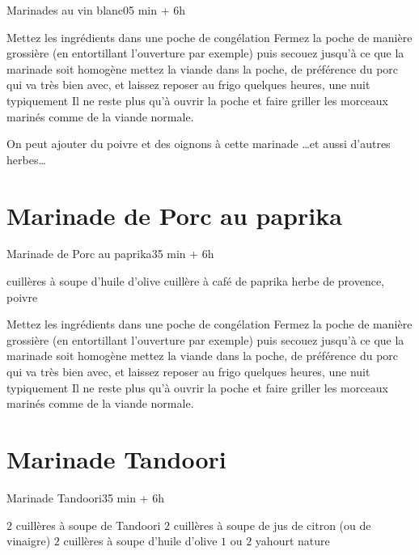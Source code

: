 {\begin{recette}{Marinades au vin blanc}{0}{5 min + 6h}{}
\begin{preparation}
\etape Mettez les ingrédients dans une poche de congélation
\etape Fermez la poche de manière grossière (en entortillant l'ouverture par exemple) puis secouez jusqu'à ce que la marinade 
soit homogène
\etape mettez la viande dans la poche, de préférence du porc qui va très bien avec, et laissez reposer au frigo quelques heures, 
une nuit typiquement
\etape Il ne reste plus qu'à ouvrir la poche et faire griller les morceaux marinés comme de la viande normale.
\end{preparation}

\begin{remarque}
On peut ajouter du poivre et des oignons à cette marinade \dots  et aussi d'autres herbes\dots
\end{remarque}
\end{recette}

\section{Marinade de Porc au paprika}
\begin{recette}{Marinade de Porc au paprika}{3}{5 min + 6h}{}
\begin{ingredients}
 cuillères à soupe d'huile d'olive
 cuillère à café de paprika
\ingredient herbe de provence, poivre
\end{ingredients}

\begin{preparation}
\etape Mettez les ingrédients dans une poche de congélation
\etape Fermez la poche de manière grossière (en entortillant l'ouverture par exemple) puis secouez jusqu'à ce que la marinade 
soit homogène
\etape mettez la viande dans la poche, de préférence du porc qui va très bien avec, et laissez reposer au frigo quelques heures, 
une nuit typiquement
\etape Il ne reste plus qu'à ouvrir la poche et faire griller les morceaux marinés comme de la viande normale.
\end{preparation}

\end{recette}

\section{Marinade Tandoori}
\begin{recette}{Marinade Tandoori}{3}{5 min + 6h}{}
\begin{ingredients}
\ingredient $2$ cuillères à soupe de Tandoori
\ingredient $2$ cuillères à soupe de jus de citron (ou de vinaigre)
\ingredient $2$ cuillères à soupe d'huile d'olive
\ingredient $1$ ou $2$ yahourt nature
\end{ingredients}


\end{recette}}
